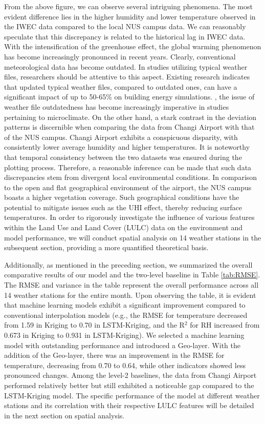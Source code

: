 \documentclass[a4paper,fleqn]{cas-sc}
\begin{document}
From the above figure, we can observe several intriguing phenomena. The most evident difference lies in the higher humidity and lower temperature observed in the IWEC data compared to the local NUS campus data. We can reasonably speculate that this discrepancy is related to the historical lag in IWEC data. With the intensification of the greenhouse effect, the global warming phenomenon has become increasingly pronounced in recent years. Clearly, conventional meteorological data has become outdated. In studies utilizing typical weather files, researchers should be attentive to this aspect. Existing research indicates that updated typical weather files, compared to outdated ones, can have a significant impact of up to 50-65\% on building energy simulations. \citep{costanzo2020updated}, the issue of weather file outdatedness has become increasingly imperative in studies pertaining to microclimate. On the other hand, a stark contrast in the deviation patterns is discernible when comparing the data from Changi Airport with that of the NUS campus. Changi Airport exhibits a conspicuous disparity, with consistently lower average humidity and higher temperatures. It is noteworthy that temporal consistency between the two datasets was ensured during the plotting process. Therefore, a reasonable inference can be made that such data discrepancies stem from divergent local environmental conditions. In comparison to the open and flat geographical environment of the airport, the NUS campus boasts a higher vegetation coverage. Such geographical conditions have the potential to mitigate issues such as the UHI effect, thereby reducing surface temperatures. In order to rigorously investigate the influence of various features within the Land Use and Land Cover (LULC) data on the environment and model performance, we will conduct spatial analysis on 14 weather stations in the subsequent section, providing a more quantified theoretical basis.

Additionally, as mentioned in the preceding section, we summarized the overall comparative results of our model and the two-level baseline in Table \ref{tab:RMSE}. The RMSE and variance in the table represent the overall performance across all 14 weather stations for the entire month. Upon observing the table, it is evident that machine learning models exhibit a significant improvement compared to conventional interpolation models (e.g., the RMSE for temperature decreased from 1.59 in Kriging to 0.70 in LSTM-Kriging, and the R$^2$ for RH increased from 0.673 in Kriging to 0.931 in LSTM-Kriging). We selected a machine learning model with outstanding performance and introduced a Geo-layer. With the addition of the Geo-layer, there was an improvement in the RMSE for temperature, decreasing from 0.70 to 0.64, while other indicators showed less pronounced changes. Among the level-2 baselines, the data from Changi Airport performed relatively better but still exhibited a noticeable gap compared to the LSTM-Kriging model. The specific performance of the model at different weather stations and its correlation with their respective LULC features will be detailed in the next section on spatial analysis.
\end{document}
